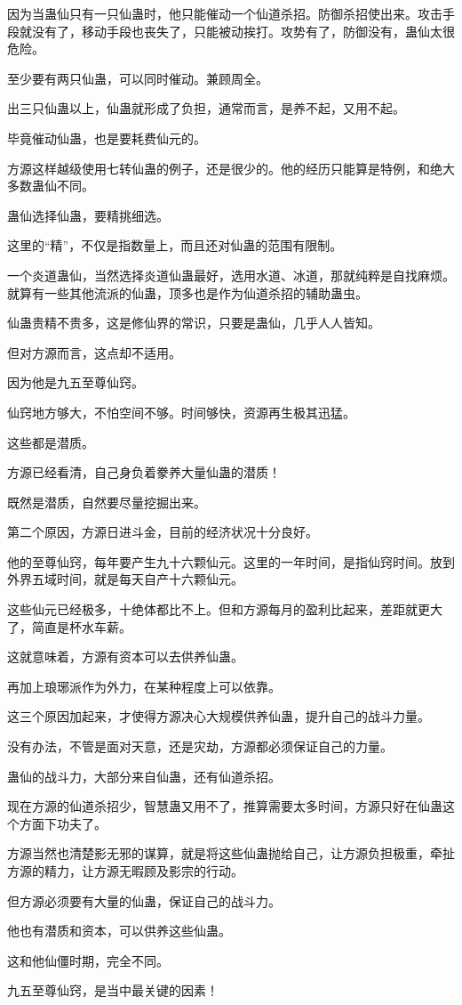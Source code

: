 \begin{this_body}
因为当蛊仙只有一只仙蛊时，他只能催动一个仙道杀招。防御杀招使出来。攻击手段就没有了，移动手段也丧失了，只能被动挨打。攻势有了，防御没有，蛊仙太很危险。

至少要有两只仙蛊，可以同时催动。兼顾周全。

出三只仙蛊以上，仙蛊就形成了负担，通常而言，是养不起，又用不起。

毕竟催动仙蛊，也是要耗费仙元的。

方源这样越级使用七转仙蛊的例子，还是很少的。他的经历只能算是特例，和绝大多数蛊仙不同。

蛊仙选择仙蛊，要精挑细选。

这里的“精”，不仅是指数量上，而且还对仙蛊的范围有限制。

一个炎道蛊仙，当然选择炎道仙蛊最好，选用水道、冰道，那就纯粹是自找麻烦。就算有一些其他流派的仙蛊，顶多也是作为仙道杀招的辅助蛊虫。

仙蛊贵精不贵多，这是修仙界的常识，只要是蛊仙，几乎人人皆知。

但对方源而言，这点却不适用。

因为他是九五至尊仙窍。

仙窍地方够大，不怕空间不够。时间够快，资源再生极其迅猛。

这些都是潜质。

方源已经看清，自己身负着豢养大量仙蛊的潜质！

既然是潜质，自然要尽量挖掘出来。

第二个原因，方源日进斗金，目前的经济状况十分良好。

他的至尊仙窍，每年要产生九十六颗仙元。这里的一年时间，是指仙窍时间。放到外界五域时间，就是每天自产十六颗仙元。

这些仙元已经极多，十绝体都比不上。但和方源每月的盈利比起来，差距就更大了，简直是杯水车薪。

这就意味着，方源有资本可以去供养仙蛊。

再加上琅琊派作为外力，在某种程度上可以依靠。

这三个原因加起来，才使得方源决心大规模供养仙蛊，提升自己的战斗力量。

没有办法，不管是面对天意，还是灾劫，方源都必须保证自己的力量。

蛊仙的战斗力，大部分来自仙蛊，还有仙道杀招。

现在方源的仙道杀招少，智慧蛊又用不了，推算需要太多时间，方源只好在仙蛊这个方面下功夫了。

方源当然也清楚影无邪的谋算，就是将这些仙蛊抛给自己，让方源负担极重，牵扯方源的精力，让方源无暇顾及影宗的行动。

但方源必须要有大量的仙蛊，保证自己的战斗力。

他也有潜质和资本，可以供养这些仙蛊。

这和他仙僵时期，完全不同。

九五至尊仙窍，是当中最关键的因素！

\end{this_body}

